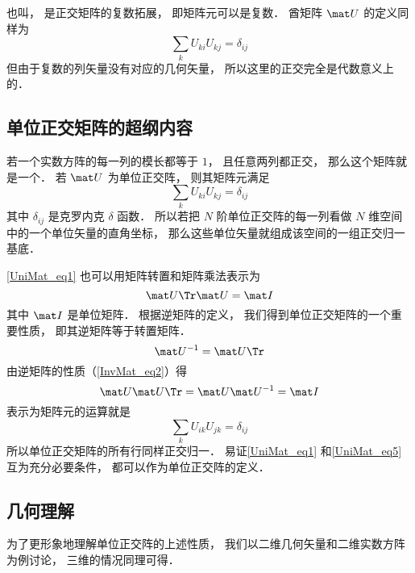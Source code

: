 

也叫， 是正交矩阵的复数拓展， 即矩阵元可以是复数． 酋矩阵 $\mat U$ 的定义同样为
\begin{equation}
\sum_k U_{ki} U_{kj} = \delta_{ij}
\end{equation}
但由于复数的列矢量没有对应的几何矢量， 所以这里的正交完全是代数意义上的．


\subsection{单位正交矩阵的超纲内容}


若一个实数方阵的每一列的模长都等于 $1$， 且任意两列都正交， 那么这个矩阵就是一个． 若 $\mat U$ 为单位正交阵， 则其矩阵元满足
\begin{equation}\label{UniMat_eq1}
\sum_k U_{ki} U_{kj} = \delta_{ij}
\end{equation}
其中 $\delta_{ij}$ 是克罗内克 $\delta$ 函数． 所以若把 $N$ 阶单位正交阵的每一列看做 $N$ 维空间中的一个单位矢量的直角坐标， 那么这些单位矢量就组成该空间的一组正交归一基底．

\autoref{UniMat_eq1} 也可以用矩阵转置和矩阵乘法表示为
\begin{equation}
\mat U\Tr \mat U = \mat I
\end{equation}
其中 $\mat I$ 是单位矩阵． 根据逆矩阵的定义， 我们得到单位正交矩阵的一个重要性质， 即其逆矩阵等于转置矩阵．
\begin{equation}
\mat U^{-1} = \mat U\Tr
\end{equation}
由逆矩阵的性质（\autoref{InvMat_eq2}）得
\begin{equation}
\mat U \mat U\Tr = \mat U \mat U^{-1} = \mat I
\end{equation}
表示为矩阵元的运算就是
\begin{equation}\label{UniMat_eq5}
\sum_k U_{ik} U_{jk} = \delta_{ij}
\end{equation}
所以单位正交矩阵的所有行同样正交归一． 易证\autoref{UniMat_eq1} 和\autoref{UniMat_eq5} 互为充分必要条件， 都可以作为单位正交阵的定义．

\subsection{几何理解}
为了更形象地理解单位正交阵的上述性质， 我们以二维几何矢量和二维实数方阵为例讨论， 三维的情况同理可得．

